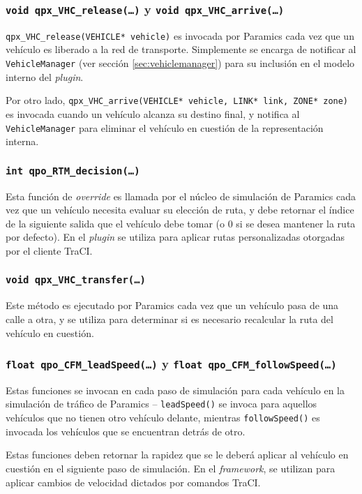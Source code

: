 \subsubsection{\texttt{void qpx\_VHC\_release(\dots)} y \texttt{void qpx\_VHC\_arrive(\dots)}}

\texttt{qpx\_VHC\_release(VEHICLE* vehicle)} es invocada por Paramics cada vez que un vehículo es liberado a la red de transporte. Simplemente se encarga de notificar al \texttt{VehicleManager} (ver sección \ref{sec:vehiclemanager}) para su inclusión en el modelo interno del \emph{plugin}.

Por otro lado, \texttt{qpx\_VHC\_arrive(VEHICLE* vehicle, LINK* link, ZONE* zone)} es invocada cuando un vehículo alcanza su destino final, y notifica al \texttt{VehicleManager} para eliminar el vehículo en cuestión de la representación interna.

\subsubsection{\texttt{int qpo\_RTM\_decision(\dots)}}\label{sec:plugin.c:decision}

Esta función de \emph{override} es llamada por el núcleo de simulación de Paramics cada vez que un vehículo necesita evaluar su elección de ruta, y debe retornar el índice de la siguiente salida que el vehículo debe tomar (o 0 si se desea mantener la ruta por defecto). En el \emph{plugin} se utiliza para aplicar rutas personalizadas otorgadas por el cliente TraCI.

\subsubsection{\texttt{void qpx\_VHC\_transfer(\dots)}}

Este método es ejecutado por Paramics cada vez que un vehículo pasa de una calle a otra, y se utiliza para determinar si es necesario recalcular la ruta del vehículo en cuestión.

\subsubsection{\texttt{float qpo\_CFM\_leadSpeed(\dots)} y \texttt{float qpo\_CFM\_followSpeed(\dots)}}\label{sec:plugin.c:speed}

Estas funciones se invocan en cada paso de simulación para cada vehículo en la simulación de tráfico de Paramics -- \texttt{leadSpeed()} se invoca para aquellos vehículos que no tienen otro vehículo delante, mientras \texttt{followSpeed()} es invocada los vehículos que se encuentran detrás de otro.

Estas funciones deben retornar la rapidez que se le deberá aplicar al vehículo en cuestión en el siguiente paso de simulación. En el \emph{framework}, se utilizan para aplicar cambios de velocidad dictados por comandos TraCI.